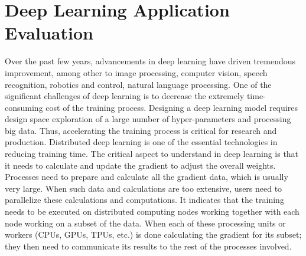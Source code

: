 \documentclass[5p,times,twocolumn]{elsarticle}
\begin{document}
\section{Deep Learning Application Evaluation}\label{sec:application}
Over the past few years, advancements in deep learning have driven
tremendous improvement, among other to image processing, computer vision, speech
recognition, robotics and control, natural language processing.  One of the significant challenges of deep learning is to
decrease the extremely time-consuming cost of the training process.
%
Designing a deep learning model
requires design space exploration of a large number of hyper-parameters and processing big data.
Thus, accelerating the training process is critical for research and production. Distributed deep learning is one of the essential technologies in reducing training time.
%
The critical aspect to understand in deep learning is that it needs to calculate and update
the gradient to adjust the overall weights.
%
Processes need to prepare and calculate all the gradient data, which is usually very large.
When such data and calculations are too extensive, users need to parallelize these calculations and computations.
%
It indicates that the training needs to be executed on distributed computing nodes working together with each node working on a subset of the data.
%
When each of these processing units or workers (CPUs, GPUs, TPUs, etc.) is done
calculating the gradient for its subset; they then need to communicate its results
to the rest of the processes involved.

\end{document}
